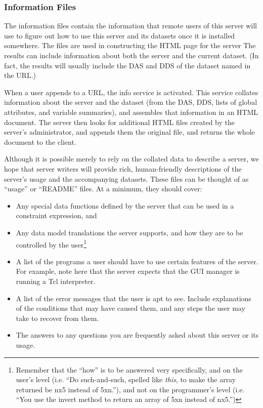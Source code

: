 \subsubsection{Information Files}
\label{dods-server:usage}
 

The information files contain the information that remote users of
this server will use to figure out how to use this server and its
datasets once it is installed somewhere.  The files are used in
constructing the HTML page for the  server  The 
results can include information about both the server and the current
dataset.  (In fact, the results will usually include the DAS and DDS
of the dataset named in the URL.)

When a user appends  to a URL, the info service is
activated.  This service collates information about the server and the
dataset (from the DAS, DDS, lists of global attributes, and variable
summaries), and assembles that information in an HTML document.  The
server then looks for additional HTML files created by the server's
administrator, and appends them the original file, and returns the
whole document to the client.

Although it is possible merely to rely on the collated data to
describe a server, we hope that server writers will provide rich,
human-friendly descriptions of the server's usage and the accompanying
datasets.  These files can be thought of as ``usage'' or ``README''
files.  At a minimum, they should cover:

\begin{itemize}
  
\item Any special data functions defined by the server that can be
  used in a constraint expression, and
  
\item Any data model translations the server supports, and how they
  are to be controlled by the user\footnote{Remember that the ``how''
    is to be answered very specifically, and on the user's level (i.e.
    ``Do such-and-such, spelled like \emph{this}, to make the array
    returned be nx5 instead of 5xn.''), and not on the programmer's
    level (i.e. ``You use the invert method to return an array of 5xn
    instead of nx5.'')}
  
\item A list of the programs a user should have to use certain
  features of the server. For example, note here that the server
  expects that the GUI manager is running a Tcl interpreter.
  
\item A list of the error messages that the user is apt to see.
  Include explanations of the conditions that may have caused them,
  and any steps the user may take to recover from them.

\item The answers to any questions you are frequently asked about this
  server or its usage.

\end{itemize}

